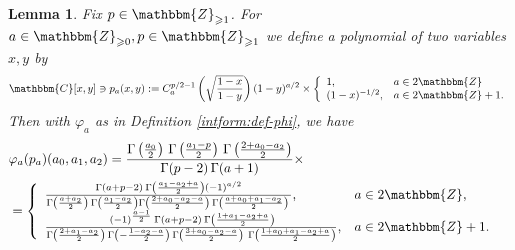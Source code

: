 \documentclass{article}
\newcommand{\assign}{:=}
\newtheorem{lemma}[proposition]{Lemma}
\theoremstyle{remark}
\begin{document}
\begin{lemma}
  \label{images:lem-hypo}Fix $p \in \mathbbm{Z}_{\geqslant 1}$. For $a \in
  \mathbbm{Z}_{\geqslant 0}, p \in \mathbbm{Z}_{\geqslant 1}$ we define a
  polynomial of two variables $x, y$ by
  \[ \mathbbm{C} [x, y] \ni p_a (x, y) \assign C^{p / 2 - 1}_a \left(
     \sqrt{\frac{1 - x}{1 - y}} \right) (1 - y)^{a / 2} \times \left\{
     \begin{array}{ll}
       1, & a \in 2\mathbbm{Z}\\
       (1 - x)^{- 1 / 2}, & a \in 2\mathbbm{Z}+ 1.
     \end{array} \right. \]
  Then with $\varphi_a$ as in Definition \ref{intform:def-phi}, we have
  \begin{eqnarray}
    & \varphi_a (p_a) (a_0, a_1, a_2) = \frac{\Gamma \left( \frac{a_0}{2}
    \right)  \hspace{0.17em} \Gamma \left( \frac{a_1 - p}{2} \right) 
    \hspace{0.17em} \Gamma \left( \frac{2 + a_0 - a_2}{2} \right)}{\Gamma (p -
    2)  \hspace{0.17em} \Gamma (a + 1)} \times &  \nonumber\\
    & = \left\{ \begin{array}{ll}
      \frac{\Gamma (a + p - 2)  \hspace{0.17em} \Gamma \left( \frac{a_1 - a_2
      + a}{2} \right) (- 1)^{a / 2}}{\Gamma \left( \frac{a + a_2}{2} \right) 
      \hspace{0.17em} \Gamma \left( \frac{a_1 - a_2}{2} \right) \Gamma \left(
      \frac{2 + a_0 - a_2 - a}{2} \right) \hspace{0.17em} \Gamma \left(
      \frac{a + a_0 + a_1 - a_2}{2} \right)  \hspace{0.17em}}, & a \in
      2\mathbbm{Z},\\
      \frac{ \hspace{0.17em} (- 1)^{\frac{a - 1}{2}}  \hspace{0.17em} \Gamma
      (a + p - 2)  \hspace{0.17em} \Gamma \left( \frac{1 + a_1 - a_2 + a}{2}
      \right)}{\Gamma \left( \frac{2 + a_1 - a_2}{2} \right)  \hspace{0.17em}
      \Gamma \left( - \frac{1 - a_2 - a}{2} \right)  \hspace{0.17em} \Gamma
      \left( \frac{3 + a_0 - a_2 - a}{2} \right)  \hspace{0.17em} 
      \hspace{0.17em} \Gamma \left( \frac{1 + a_0 + a_1 - a_2 + a}{2}
      \right)}, & a \in 2\mathbbm{Z}+ 1.
    \end{array} \right. &  \nonumber
  \end{eqnarray}
\end{lemma}
\end{document}
